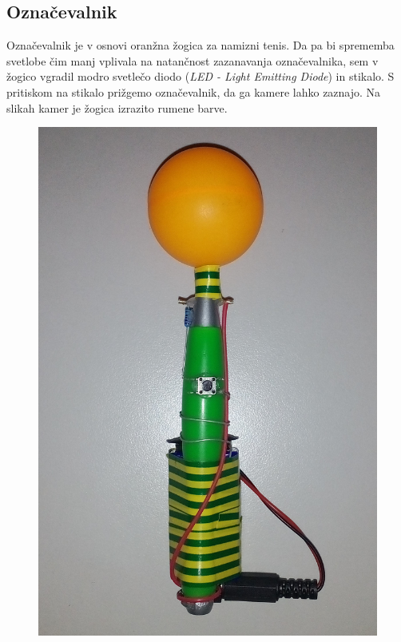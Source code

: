 \documentclass[a4paper, 12pt]{book}
\begin{document}
\subsection{Označevalnik}
Označevalnik je v osnovi oranžna žogica za namizni tenis. Da pa bi sprememba svetlobe čim manj vplivala na natančnost zazanavanja označevalnika, sem v žogico vgradil modro svetlečo diodo (\emph{LED - Light Emitting Diode}) in stikalo. S pritiskom na stikalo prižgemo označevalnik, da ga kamere lahko zaznajo. Na slikah kamer je žogica izrazito rumene barve.

\begin{figure}[H]
\centering
\includegraphics[scale=0.4]{marker_off.png}

\end{figure}
\end{document}
